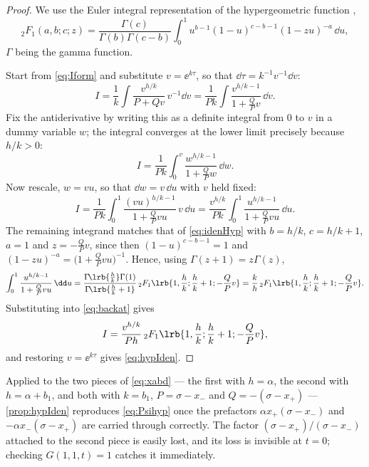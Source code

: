 \begin{proof}
We use the Euler integral representation of the hypergeometric function
\cite{Olver2010},
\begin{equation}
\label{eq:idenHyp}
{}_2F_1(a,b;c;z)
= \frac{\Gamma(c)}{\Gamma(b)\Gamma(c-b)}\int_0^1 u^{b-1}(1-u)^{c-b-1}(1-zu)^{-a}\,\dd u ,
\end{equation}
$\Gamma$ being the gamma function.

Start from \cref{eq:Iform} and substitute $v = \ee^{k\tau}$, so that
$\dd\tau = k^{-1}v^{-1}\dd v$:
\begin{equation*}
I = \frac1k\int\frac{v^{h/k}}{P+Qv}\,v^{-1}\dd v
= \frac{1}{Pk}\int\frac{v^{h/k-1}}{1+\frac{Q}{P}v}\,\dd v .
\end{equation*}
Fix the antiderivative by writing this as a definite integral from $0$ to $v$ in a
dummy variable $w$; the integral converges at the lower limit precisely because
$h/k>0$:
\begin{equation*}
I = \frac{1}{Pk}\int_0^v\frac{w^{h/k-1}}{1+\frac{Q}{P}w}\,\dd w .
\end{equation*}
Now rescale, $w = vu$, so that $\dd w = v\,\dd u$ with $v$ held fixed:
\begin{equation}
\label{eq:backat}
I = \frac{1}{Pk}\int_0^1\frac{(vu)^{h/k-1}}{1+\frac{Q}{P}vu}\,v\,\dd u
= \frac{v^{h/k}}{Pk}\int_0^1\frac{u^{h/k-1}}{1+\frac{Q}{P}vu}\,\dd u .
\end{equation}
The remaining integrand matches that of \cref{eq:idenHyp} with $b = h/k$,
$c = h/k+1$, $a=1$ and $z = -\tfrac{Q}{P}v$, since then $(1-u)^{c-b-1} = 1$ and
$(1-zu)^{-a} = \bigl(1+\tfrac{Q}{P}vu\bigr)^{-1}$. Hence, using
$\Gamma(z+1) = z\Gamma(z)$,
\begin{equation*}
\int_0^1\frac{u^{h/k-1}}{1+\frac{Q}{P}vu}\,\dd u
= \frac{\Gamma\!\lrb{\frac hk}\Gamma(1)}{\Gamma\!\lrb{\frac hk+1}}\,
{}_2F_1\lrb{1,\frac hk;\frac hk+1;-\frac QP v}
= \frac kh\,{}_2F_1\lrb{1,\frac hk;\frac hk+1;-\frac QP v}.
\end{equation*}
Substituting into \cref{eq:backat} gives
\begin{equation*}
I = \frac{v^{h/k}}{Ph}\,{}_2F_1\lrb{1,\frac hk;\frac hk+1;-\frac QP v},
\end{equation*}
and restoring $v = \ee^{k\tau}$ gives \cref{eq:hypIden}.
\end{proof}

\begin{remark}
Applied to the two pieces of \cref{eq:xabd} --- the first with $h=\alpha$, the
second with $h = \alpha+b_1$, and both with $k=b_1$, $P = \sigma-x_-$ and
$Q = -(\sigma-x_+)$ --- \cref{prop:hypIden} reproduces \cref{eq:Psihyp} once the
prefactors $\alpha x_+(\sigma-x_-)$ and $-\alpha x_-(\sigma-x_+)$ are carried
through correctly. The factor $(\sigma-x_+)/(\sigma-x_-)$ attached to the second
piece is easily lost, and its loss is invisible at $t=0$; checking $G(1,1,t)=1$
catches it immediately.
\end{remark}

